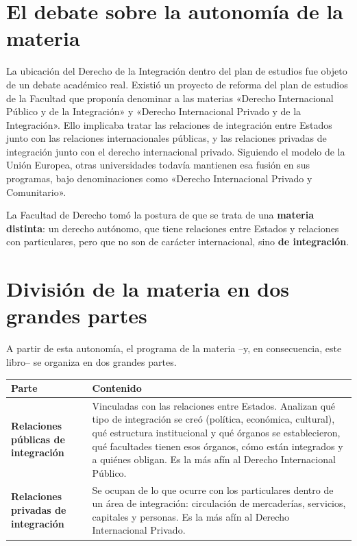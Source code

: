 \documentclass[12pt,oneside]{book}
\begin{document}
\section{El debate sobre la autonomía de la materia}

La ubicación del Derecho de la Integración dentro del plan de estudios fue objeto de un debate académico real. Existió un proyecto de reforma del plan de estudios de la Facultad que proponía denominar a las materias «Derecho Internacional Público y de la Integración» y «Derecho Internacional Privado y de la Integración». Ello implicaba tratar las relaciones de integración entre Estados junto con las relaciones internacionales públicas, y las relaciones privadas de integración junto con el derecho internacional privado. Siguiendo el modelo de la Unión Europea, otras universidades todavía mantienen esa fusión en sus programas, bajo denominaciones como «Derecho Internacional Privado y Comunitario».

\begin{importante}
La Facultad de Derecho tomó la postura de que se trata de una \textbf{materia distinta}: un derecho autónomo, que tiene relaciones entre Estados y relaciones con particulares, pero que no son de carácter internacional, sino \textbf{de integración}.
\end{importante}

\section{División de la materia en dos grandes partes}

A partir de esta autonomía, el programa de la materia --y, en consecuencia, este libro-- se organiza en dos grandes partes.

\begin{table}[H]
\centering
\small
\renewcommand{\arraystretch}{1.3}
\begin{tabularx}{\textwidth}{>{\raggedright\arraybackslash}p{}>{\raggedright\arraybackslash}X}
\toprule
\textbf{Parte} & \textbf{Contenido} \\
\midrule
\textbf{Relaciones públicas de integración} & Vinculadas con las relaciones entre Estados. Analizan qué tipo de integración se creó (política, económica, cultural), qué estructura institucional y qué órganos se establecieron, qué facultades tienen esos órganos, cómo están integrados y a quiénes obligan. Es la más afín al Derecho Internacional Público. \\
\addlinespace
\textbf{Relaciones privadas de integración} & Se ocupan de lo que ocurre con los particulares dentro de un área de integración: circulación de mercaderías, servicios, capitales y personas. Es la más afín al Derecho Internacional Privado. \\
\bottomrule
\end{tabularx}
\end{table}
\end{document}
